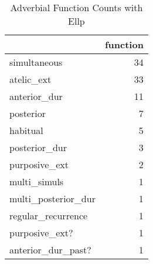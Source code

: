 \begin{table}[htbp!]
\centering
\caption{Adverbial Function Counts with Ellp}
\label{table:Ellp_funct_ct}
\begin{tabular}{lr}
\toprule
{} &  function \\
\midrule
simultaneous        &        34 \\
atelic\_ext          &        33 \\
anterior\_dur        &        11 \\
posterior           &         7 \\
habitual            &         5 \\
posterior\_dur       &         3 \\
purposive\_ext       &         2 \\
multi\_simuls        &         1 \\
multi\_posterior\_dur &         1 \\
regular\_recurrence  &         1 \\
purposive\_ext?      &         1 \\
anterior\_dur\_past?  &         1 \\
\bottomrule
\end{tabular}
\end{table}
